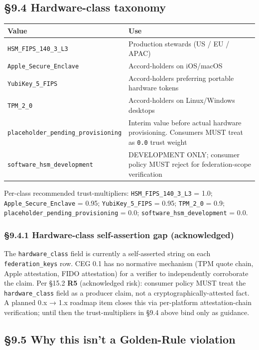 \documentclass[10pt]{article}
\begin{document}
\subsection*{§9.4 Hardware-class taxonomy}


{\footnotesize
\begin{longtable}{|p{8.0cm}|p{8.0cm}|}\hline
\textbf{Value} & \textbf{Use} \\ \hline\endhead
\texttt{HSM\_FIPS\_140\_3\_L3} & Production stewards (US / EU / APAC) \\ \hline
\texttt{Apple\_Secure\_Enclave} & Accord-holders on iOS/macOS \\ \hline
\texttt{YubiKey\_5\_FIPS} & Accord-holders preferring portable hardware tokens \\ \hline
\texttt{TPM\_2\_0} & Accord-holders on Linux/Windows desktops \\ \hline
\texttt{placeholder\_pending\_provisioning} & Interim value before actual hardware provisioning. Consumers MUST treat as \texttt{0.0} trust weight \\ \hline
\texttt{software\_hsm\_development} & DEVELOPMENT ONLY; consumer policy MUST reject for federation-scope verification \\ \hline
\end{longtable}}


Per-class recommended trust-multipliers: \texttt{HSM\_FIPS\_140\_3\_L3} = 1.0; \texttt{Apple\_Secure\_Enclave} = 0.95; \texttt{YubiKey\_5\_FIPS} = 0.95; \texttt{TPM\_2\_0} = 0.9; \texttt{placeholder\_pending\_provisioning} = 0.0; \texttt{software\_hsm\_development} = 0.0.


\subsubsection*{§9.4.1 Hardware-class self-assertion gap (acknowledged)}


The \texttt{hardware\_class} field is currently a self-asserted string on each \texttt{federation\_keys} row. CEG 0.1 has no normative mechanism (TPM quote chain, Apple attestation, FIDO attestation) for a verifier to independently corroborate the claim. Per §15.2 \textbf{R5} (acknowledged risk): consumer policy MUST treat the \texttt{hardware\_class} field as a producer claim, not a cryptographically-attested fact. A planned 0.x → 1.x roadmap item closes this via per-platform attestation-chain verification; until then the trust-multipliers in §9.4 above bind only as guidance.


\subsection*{§9.5 Why this isn't a Golden-Rule violation}
\end{document}
